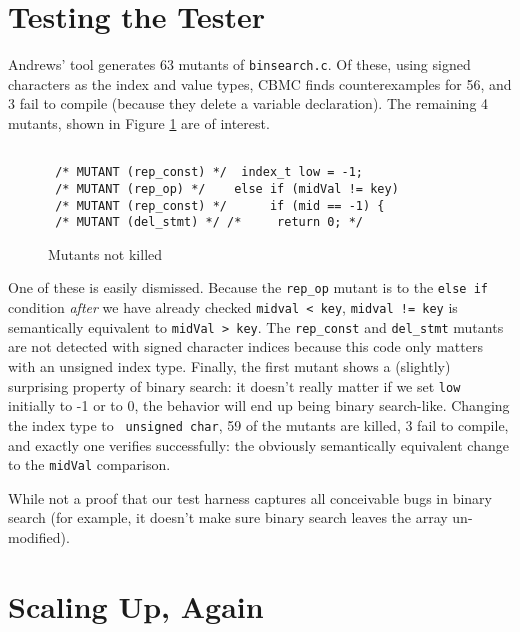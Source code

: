\documentclass{article}
\begin{document}
\section{Testing the Tester}

Andrews' tool generates 63 mutants of {\tt binsearch.c}.  Of these,
using signed characters as the index and value types, CBMC finds
counterexamples for 56, and 3 fail to compile (because they delete a
variable declaration).  The remaining 4 mutants, shown in Figure
\ref{fig:mutants} are of interest.

\begin{figure}
\begin{verbatim}

 /* MUTANT (rep_const) */  index_t low = -1;
 /* MUTANT (rep_op) */    else if (midVal != key)
 /* MUTANT (rep_const) */      if (mid == -1) {
 /* MUTANT (del_stmt) */ /*     return 0; */ 

\end{verbatim}
\caption{Mutants not killed}
\label{fig:mutants}
\end{figure}

One of these is easily dismissed.  Because the {\tt rep\_op} mutant is
to the {\tt else if} condition \emph{after} we have already checked
{\tt midval < key}, {\tt midval != key} is semantically equivalent to
{\tt midVal > key}.  The {\tt rep\_const} and {\tt del\_stmt} mutants
are not detected with signed character indices because this code only
matters with an unsigned index type.  Finally, the first mutant shows
a (slightly) surprising property of binary search: it doesn't really
matter if we set {\tt low} initially to -1 or to 0, the behavior will
end up being binary search-like.  Changing the index type to {\tt
unsigned char}, 59 of the mutants are killed, 3 fail to compile, and
exactly one verifies successfully: the obviously semantically
equivalent change to the {\tt midVal} comparison.

While not a proof that our test harness captures all conceivable bugs
in binary search (for example, it doesn't make sure binary search
leaves the array un-modified).

\section{Scaling Up, Again}
\end{document}
